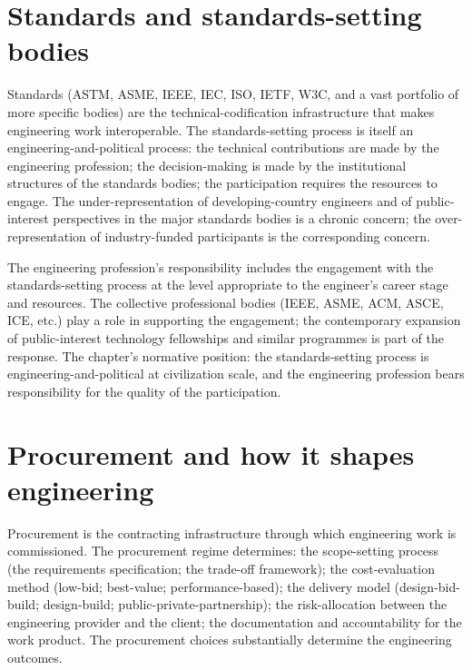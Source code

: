 \section{Standards and standards-setting bodies}

Standards (ASTM, ASME, IEEE, IEC, ISO, IETF, W3C, and a vast portfolio of more specific bodies) are the technical-codification infrastructure that makes engineering work interoperable. The standards-setting process is itself an engineering-and-political process: the technical contributions are made by the engineering profession; the decision-making is made by the institutional structures of the standards bodies; the participation requires the resources to engage. The under-representation of developing-country engineers and of public-interest perspectives in the major standards bodies is a chronic concern; the over-representation of industry-funded participants is the corresponding concern.

The engineering profession's responsibility includes the engagement with the standards-setting process at the level appropriate to the engineer's career stage and resources. The collective professional bodies (IEEE, ASME, ACM, ASCE, ICE, etc.) play a role in supporting the engagement; the contemporary expansion of public-interest technology fellowships and similar programmes is part of the response. The chapter's normative position: the standards-setting process is engineering-and-political at civilization scale, and the engineering profession bears responsibility for the quality of the participation.

\section{Procurement and how it shapes engineering}

Procurement is the contracting infrastructure through which engineering work is commissioned. The procurement regime determines: the scope-setting process (the requirements specification; the trade-off framework); the cost-evaluation method (low-bid; best-value; performance-based); the delivery model (design-bid-build; design-build; public-private-partnership); the risk-allocation between the engineering provider and the client; the documentation and accountability for the work product. The procurement choices substantially determine the engineering outcomes.

